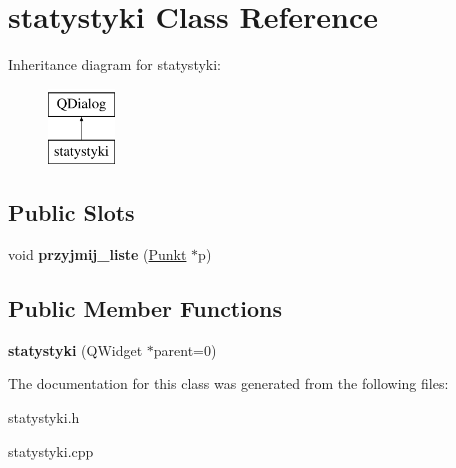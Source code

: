 \hypertarget{classstatystyki}{}\section{statystyki Class Reference}
\label{classstatystyki}
Inheritance diagram for statystyki\+:\begin{figure}[H]
\begin{center}
\leavevmode
\includegraphics[height=2.000000cm]{classstatystyki}
\end{center}
\end{figure}
\subsection*{Public Slots}
\begin{DoxyCompactItemize}
\item 
\mbox{\label{classstatystyki_a9f9e95c6be756519f6abd4b08bbff1f2}} 
void {\bfseries przyjmij\+\_\+liste} (\mbox{\hyperlink{struct_punkt}{Punkt}} $\ast$p)
\end{DoxyCompactItemize}
\subsection*{Public Member Functions}
\begin{DoxyCompactItemize}
\item 
\mbox{\label{classstatystyki_a93e8666d44ca5614a575a091f4b1eb11}} 
{\bfseries statystyki} (Q\+Widget $\ast$parent=0)
\end{DoxyCompactItemize}


The documentation for this class was generated from the following files\+:\begin{DoxyCompactItemize}
\item 
statystyki.\+h\item 
statystyki.\+cpp\end{DoxyCompactItemize}
